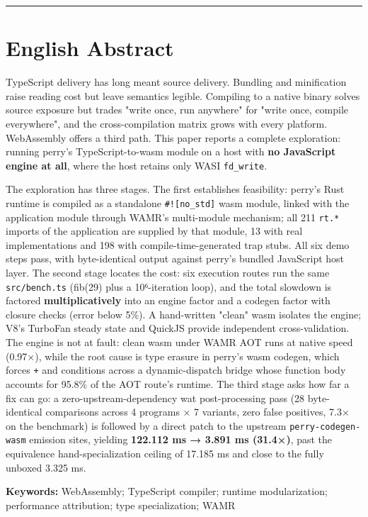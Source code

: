 \documentclass[11pt, a4paper]{article}
\begin{document}
\bigskip\hrule\bigskip

\section{English Abstract}

TypeScript delivery has long meant source delivery. Bundling and minification raise reading cost but leave semantics legible. Compiling to a native binary solves source exposure but trades "write once, run anywhere" for "write once, compile everywhere", and the cross-compilation matrix grows with every platform. WebAssembly offers a third path. This paper reports a complete exploration: running perry's TypeScript-to-wasm module on a host with \textbf{no JavaScript engine at all}, where the host retains only WASI \texttt{fd\_write}.


The exploration has three stages. The first establishes feasibility: perry's Rust runtime is compiled as a standalone \texttt{\#![no\_std]} wasm module, linked with the application module through WAMR's multi-module mechanism; all 211 \texttt{rt.*} imports of the application are supplied by that module, 13 with real implementations and 198 with compile-time-generated trap stubs. All six demo steps pass, with byte-identical output against perry's bundled JavaScript host layer. The second stage locates the cost: six execution routes run the same \texttt{src/bench.ts} (fib(29) plus a 10⁶-iteration loop), and the total slowdown is factored \textbf{multiplicatively} into an engine factor and a codegen factor with closure checks (error below 5\%). A hand-written "clean" wasm isolates the engine; V8's TurboFan steady state and QuickJS provide independent cross-validation. The engine is not at fault: clean wasm under WAMR AOT runs at native speed (0.97×), while the root cause is type erasure in perry's wasm codegen, which forces \texttt{+} and conditions across a dynamic-dispatch bridge whose function body accounts for 95.8\% of the AOT route's runtime. The third stage asks how far a fix can go: a zero-upstream-dependency wat post-processing pass (28 byte-identical comparisons across 4 programs × 7 variants, zero false positives, 7.3× on the benchmark) is followed by a direct patch to the upstream \texttt{perry-codegen-wasm} emission sites, yielding \textbf{122.112 ms → 3.891 ms (31.4×)}, past the equivalence hand-specialization ceiling of 17.185 ms and close to the fully unboxed 3.325 ms.


\textbf{Keywords:} WebAssembly; TypeScript compiler; runtime modularization; performance attribution; type specialization; WAMR
\end{document}
